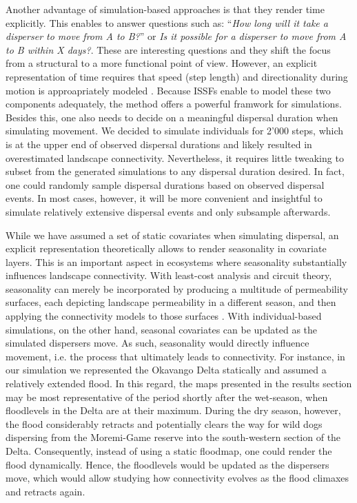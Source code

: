 \documentclass[abstract=on,10pt,a4paper,bibliography=totocnumbered]{article}
\begin{document}
Another advantage of simulation-based approaches is that they render time
explicitly. This enables to answer questions such as: ``\textit{How long will it
take a disperser to move from A to B?}'' or \textit{Is it possible for a
disperser to move from A to B within X days?}. These are interesting questions
and they shift the focus from a structural to a more functional point of view.
However, an explicit representation of time requires that speed (step length)
and directionality during motion is approapriately modeled
\citep{Kanagaraj.2013}. Because ISSFs enable to model these two components
adequately, the method offers a powerful framwork for simulations. Besides this,
one also needs to decide on a meaningful dispersal duration when simulating
movement. We decided to simulate individuals for 2'000 steps, which is at the
upper end of observed dispersal durations and likely resulted in overestimated
landscape connectivity. Nevertheless, it requires little tweaking to subset from
the generated simulations to any dispersal duration desired. In fact, one could
randomly sample dispersal durations based on observed dispersal events. In most
cases, however, it will be more convenient and insightful to simulate relatively
extensive dispersal events and only subsample afterwards.

While we have assumed a set of static covariates when simulating dispersal, an
explicit representation theoretically allows to render seasonality in covariate
layers. This is an important aspect in ecosystems where seasonality
substantially influences landscape connectivity. With least-cost analysis and
circuit theory, seasonality can merely be incorporated by producing a multitude
of permeability surfaces, each depicting landscape permeability in a different
season, and then applying the connectivity models to those surfaces
\citep{Benz.2016, Osipova.2019}. With individual-based simulations, on the other
hand, seasonal covariates can be updated as the simulated dispersers move. As
such, seasonality would directly influence movement, i.e. the process that
ultimately leads to connectivity. For instance, in our simulation we represented
the Okavango Delta statically and assumed a relatively extended flood. In this
regard, the maps presented in the results section may be most representative of
the period shortly after the wet-season, when floodlevels in the Delta are at
their maximum. During the dry season, however, the flood considerably retracts
and potentially clears the way for wild dogs dispersing from the Moremi-Game
reserve into the south-western section of the Delta. Consequently, instead of
using a static floodmap, one could render the flood dynamically. Hence, the
floodlevels would be updated as the dispersers move, which would allow studying
how connectivity evolves as the flood climaxes and retracts again.
\end{document}

